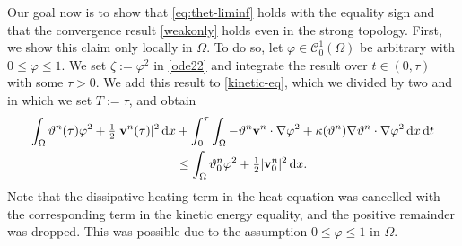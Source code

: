 \documentclass[11pt, a4paper, reqno]{amsart}
\numberwithin{equation}{section}
\newcommand{\vc}[1]{{\bf #1}}
\newcommand{\vv}{\vc{v}}
\newcommand{\thet}{\vartheta}
\newcommand{\dt}{\,{\rm d} t }
\newcommand{\dx}{\,{\rm d} {x}}
\newcommand{\dxdt}{\dx  \dt}
\newcommand{\intO}[1]{\int_{\Omega} #1 \dx}
\newcommand{\inttO}[1]{\int_0^{\tau} \int_{\Omega} #1 \dxdt}
\begin{document}
Our goal now is to show that \eqref{eq:thet-liminf} holds with the equality sign and that the convergence result \eqref{weakonly} holds even in the strong topology. First, we show this claim only locally in $\Omega$. To do so, let $\varphi \in \mathcal{C}^1_0(\Omega)$ be arbitrary with $0 \le \varphi \le 1$. 
We set $\zeta := \varphi^2$ in \eqref{ode22} and integrate the result over $t \in (0,\tau)$ with some $\tau>0$. We add this result to \eqref{kinetic-eq}, which we divided by two and in which we set $T := \tau$, and obtain
\begin{equation*}\begin{split}
\intO{\thet^n(\tau)\varphi^2+\tfrac12|\vv^n(\tau)|^2}
&+\inttO{-\thet^n\vv^n\cdot \nabla\varphi^2+\kappa(\thet^n)\nabla\thet^n \cdot \nabla\varphi^2} \\
&\leq\intO{\thet_0^n\varphi^2+\tfrac12|\vv_0^n|^2}.
\end{split}\end{equation*}
Note that the dissipative heating term in the heat equation was cancelled with the corresponding term in the kinetic energy equality, and the positive remainder was dropped. This was possible due to the assumption $0 \le \varphi \le 1$ in $\Omega$.
\end{document}
